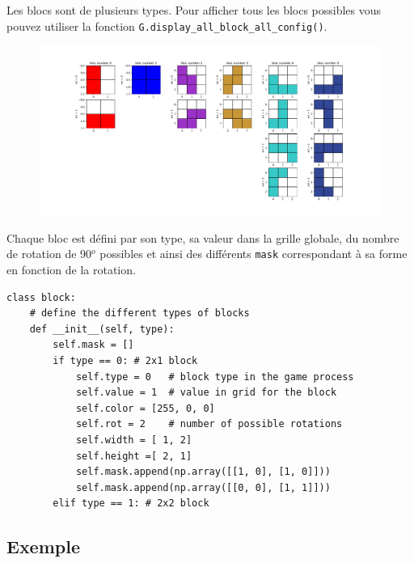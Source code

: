 \documentclass[10pt,a4paper]{article}
\begin{document}
Les blocs sont de plusieurs types. Pour afficher tous les blocs possibles vous pouvez utiliser la fonction \texttt{G.display_all_block_all_config()}.

\begin{figure}[ht!]
	\centering
	\includegraphics[width=\textwidth]{all_blocks.pdf}
\end{figure}

Chaque bloc est défini par son type, sa valeur dans la grille globale, du nombre de rotation de 90$^o$ possibles et ainsi des différents \texttt{mask} correspondant à sa forme en fonction de la rotation.
\begin{verbatim}
class block:
	# define the different types of blocks
	def __init__(self, type):
		self.mask = []
		if type == 0: # 2x1 block
			self.type = 0   # block type in the game process
			self.value = 1  # value in grid for the block
			self.color = [255, 0, 0]
			self.rot = 2    # number of possible rotations
			self.width = [ 1, 2]
			self.height =[ 2, 1]
			self.mask.append(np.array([[1, 0], [1, 0]]))      
			self.mask.append(np.array([[0, 0], [1, 1]]))      
		elif type == 1: # 2x2 block
\end{verbatim}

\subsection*{Exemple}
\end{document}
